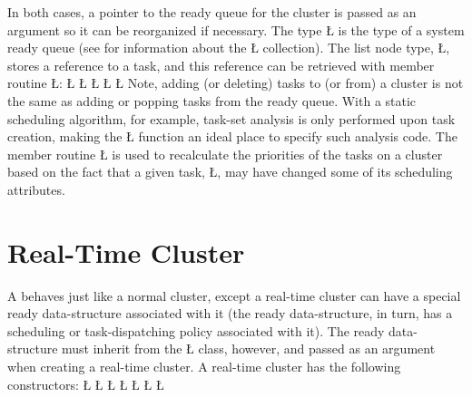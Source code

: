 \documentclass[openright,twoside]{report}
\begin{document}
In both cases, a pointer to the ready queue for the cluster is passed as an argument so it can be reorganized if necessary.
The type \LGinlinetrue\LGbegin\lgrinde\L{}\endlgrinde\LGend{} is the type of a system ready queue (see  for information about the \LGinlinetrue\LGbegin\lgrinde\L{}\endlgrinde\LGend{} collection).
The list node type, \LGinlinetrue\LGbegin\lgrinde\L{}\endlgrinde\LGend{}, stores a reference to a task, and this reference can be retrieved with member routine \LGinlinetrue\LGbegin\lgrinde\L{}\endlgrinde\LGend{}:
\LGinlinefalse\LGbegin\lgrinde
\L{}
\L{}
\L{\LB{}}
\L{\LB{}}
\L{}
\CE{}\endlgrinde\LGend
Note, adding (or deleting) tasks to (or from) a cluster is not the same as adding or popping tasks from the ready queue.
With a static scheduling algorithm, for example, task-set analysis is only performed upon task creation, making the \LGinlinetrue\LGbegin\lgrinde\L{}\endlgrinde\LGend{} function an ideal place to specify such analysis code.
The member routine \LGinlinetrue\LGbegin\lgrinde\L{}\endlgrinde\LGend{} is used to recalculate the priorities of the tasks on a cluster based on the fact that a given task, \LGinlinetrue\LGbegin\lgrinde\L{}\endlgrinde\LGend{}, may have changed some of its scheduling attributes.


\section{Real-Time Cluster}

A  behaves just like a normal \uC cluster, except a real-time cluster can have a special ready data-structure associated with it (the ready data-structure, in turn, has a scheduling or task-dispatching policy associated with it).
The ready data-structure must inherit from the \LGinlinetrue\LGbegin\lgrinde\L{}\endlgrinde\LGend{} class, however, and passed as an argument when creating a real-time cluster.
A real-time cluster has the following constructors: 
\LGinlinefalse\LGbegin\lgrinde
\L{}
\L{}
\L{\LB{}}
\L{\LB{}}
\L{\LB{}}
\L{\LB{}}
\L{\LB{\};}}
\endlgrinde\LGend
\end{document}
